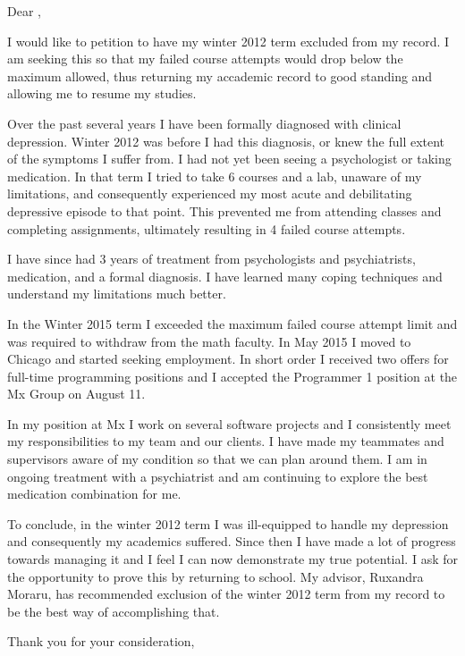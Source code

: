 \documentclass{letter}
\begin{document}
\begin{letter}{}
    \opening{Dear ,}
    I would like to petition to have my winter 2012 term excluded from my record.
    I am seeking this so that my failed course attempts would drop below the maximum allowed,
    thus returning my accademic record to good standing and allowing me to resume my studies.

    Over the past several years I have been formally diagnosed with clinical depression.
    Winter 2012 was before I had this diagnosis,
    or knew the full extent of the symptoms I suffer from.
    I had not yet been seeing a psychologist or taking medication.
    In that term I tried to take 6 courses and a lab, unaware of my limitations,
    and consequently experienced my most acute and debilitating depressive episode to that point.
    This prevented me from attending classes and completing assignments,
    ultimately resulting in 4 failed course attempts.

    I have since had 3 years of treatment from psychologists and psychiatrists,
    medication, and a formal diagnosis.
    I have learned many coping techniques and understand my limitations much better.

    In the Winter 2015 term I exceeded the maximum failed course attempt limit
    and was required to withdraw from the math faculty.
    In May 2015 I moved to Chicago and started seeking employment.
    In short order I received two offers for full-time programming positions
    and I accepted the Programmer 1 position at the Mx Group on August 11.

    In my position at Mx I work on several software projects and
    I consistently meet my responsibilities to my team and our clients.
    I have made my teammates and supervisors aware of my condition
    so that we can plan around them.
    I am in ongoing treatment with a psychiatrist and am continuing to explore
    the best medication combination for me.

    To conclude, in the winter 2012 term I was ill-equipped to handle my depression
    and consequently my academics suffered.
    Since then I have made a lot of progress towards managing it
    and I feel I can now demonstrate my true potential.
    I ask for the opportunity to prove this by returning to school.
    My advisor, Ruxandra Moraru,
    has recommended exclusion of the winter 2012 term from my record
    to be the best way of accomplishing that.

    \closing{Thank you for your consideration,}
\end{letter}
\end{document}
